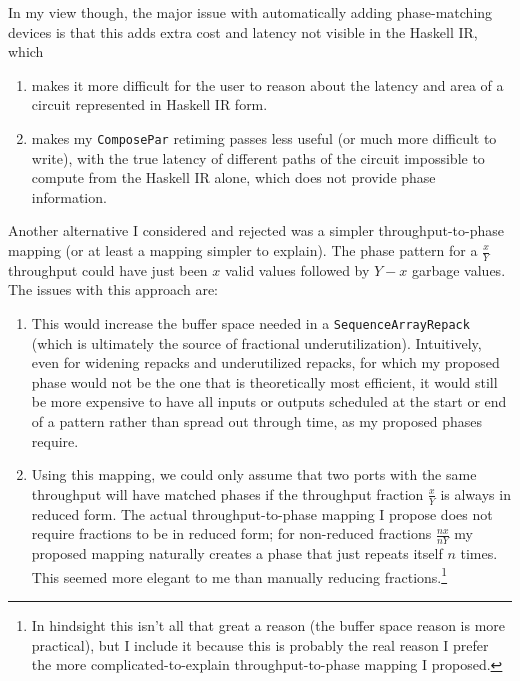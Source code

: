 \documentclass[12pt]{article}
\begin{document}
In my view though, the major issue with automatically adding
phase-matching devices is that this adds extra cost and latency not
visible in the Haskell IR, which
\begin{enumerate}
\item makes it more difficult for the user to reason about the latency
and area of a circuit represented in Haskell IR form.

\item makes my \texttt{ComposePar} retiming passes less useful (or much
more difficult to write), with the true latency of different paths of
the circuit impossible to compute from the Haskell IR alone, which does
not provide phase information.
\end{enumerate}

Another alternative I considered and rejected was a simpler
throughput-to-phase mapping (or at least a mapping simpler to
explain). The phase pattern for a $\frac{x}{Y}$ throughput could have
just been $x$ valid values followed by $Y-x$ garbage values.
The issues with this approach are:
\begin{enumerate}
\item This would increase the buffer space needed in a
  \texttt{SequenceArrayRepack} (which is ultimately the source of
  fractional underutilization). Intuitively, even for widening repacks
  and underutilized repacks, for which my proposed phase would not be
  the one that is theoretically most efficient, it would still be more
  expensive to have all inputs or outputs scheduled at the start or
  end of a pattern rather than spread out through time, as my proposed
  phases require.

\item Using this mapping, we could only assume that two ports with the
  same throughput will have matched phases if the throughput fraction
  $\frac{x}{Y}$ is always in reduced form. The actual
  throughput-to-phase mapping I propose does not require fractions to
  be in reduced form; for non-reduced fractions $\frac{nx}{nY}$ my
  proposed mapping naturally creates a phase that just repeats itself
  $n$ times. This seemed more elegant to me than manually reducing
  fractions.\footnote{In hindsight this isn't all that great a reason
    (the buffer space reason is more practical), but I include it
    because this is probably the real reason I prefer the more
    complicated-to-explain throughput-to-phase mapping I proposed.}
\end{enumerate}

\end{document}
